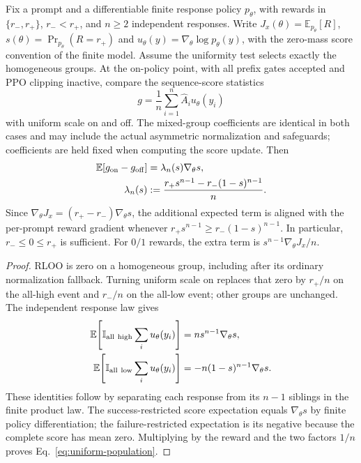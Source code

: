 \begin{proposition}
\label{prop:uniform-population}
Fix a prompt and a differentiable finite response policy $p_\theta$, with
rewards in $\{r_-,r_+\}$, $r_-<r_+$, and $n\ge2$ independent responses.
Write $J_x(\theta)=\mathbb E_{p_\theta}[R]$,
$s(\theta)=\Pr_{p_\theta}(R=r_+)$ and
$u_\theta(y)=\nabla_\theta\log p_\theta(y)$, with the zero-mass score
convention of the finite model. Assume the uniformity test selects exactly
the homogeneous groups. At the on-policy point, with all prefix gates
accepted and PPO clipping inactive, compare the sequence-score statistics
\begin{equation*}
    g=\frac1n\sum_{i=1}^n\hat A_i u_\theta(y_i)
\end{equation*}
with uniform scale on and off. The mixed-group coefficients are identical
in both cases and may include the actual asymmetric normalization and
safeguards; coefficients are held fixed when computing the score update.
Then
\begin{align}
    \mathbb{E}[g_{\mathrm{on}}-g_{\mathrm{off}}]
      &=\lambda_n(s)\nabla_\theta s,
      \label{eq:uniform-population}\\
    \lambda_n(s)
      &:=\frac{r_+s^{n-1}-r_-(1-s)^{n-1}}{n}.
      \nonumber
\end{align}
Since $\nabla_\theta J_x=(r_+-r_-)\nabla_\theta s$, the additional
expected term is aligned with the per-prompt reward gradient whenever
$r_+s^{n-1}\ge r_-(1-s)^{n-1}$. In particular, $r_-\le0\le r_+$
is sufficient. For $0/1$ rewards, the extra term is
$s^{n-1}\nabla_\theta J_x/n$.
\end{proposition}

\begin{proof}
RLOO is zero on a homogeneous group, including after its ordinary
normalization fallback. Turning uniform scale on replaces that zero by
$r_+/n$ on the all-high event and $r_-/n$ on the all-low event; other
groups are unchanged. The independent response law gives
\begin{align*}
    \mathbb{E}\!\left[\mathbb I_{\mathrm{all\ high}}\sum_i u_\theta(y_i)\right]
      &=n s^{n-1}\nabla_\theta s,\\
    \mathbb{E}\!\left[\mathbb I_{\mathrm{all\ low}}\sum_i u_\theta(y_i)\right]
      &=-n(1-s)^{n-1}\nabla_\theta s.
\end{align*}
These identities follow by separating each response from its $n-1$
siblings in the finite product law. The success-restricted score
expectation equals $\nabla_\theta s$ by finite policy differentiation;
the failure-restricted expectation is its negative because the complete
score has mean zero. Multiplying by the reward and the two factors $1/n$
proves Eq.~\eqref{eq:uniform-population}.
\end{proof}

